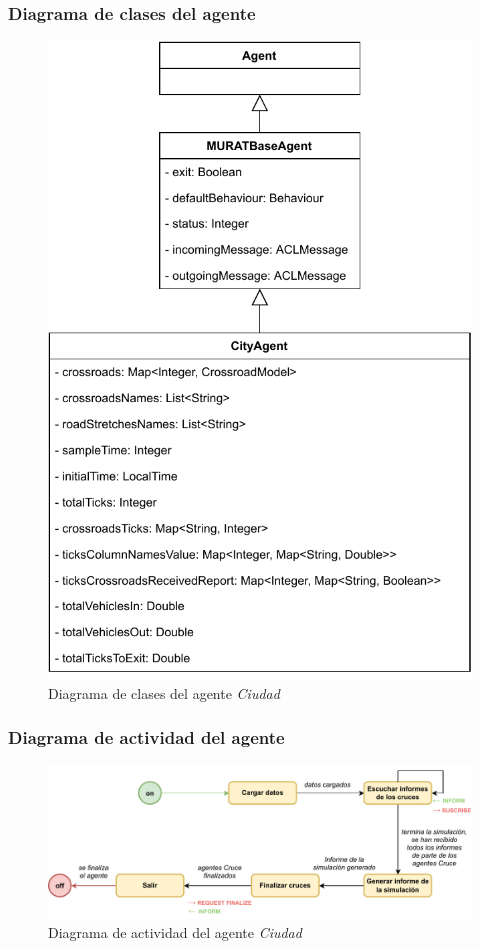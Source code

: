 \subsubsection{Diagrama de clases del agente}
\begin{figure}[H]
    \centering
    \includegraphics[width=0.60\linewidth]{text/image/DAgen-DC-City.pdf}
    \caption{Diagrama de clases del agente \textit{Ciudad}}
    \label{fig:dc_agente_ciudad}
\end{figure}

\subsubsection{Diagrama de actividad del agente}
\begin{figure}[H]
    \centering
    \includegraphics[width=1\linewidth]{text/image/DAgen-DA-City.pdf}
    \caption{Diagrama de actividad del agente \textit{Ciudad}}
    \label{fig:da_agente_ciudad}
\end{figure}

